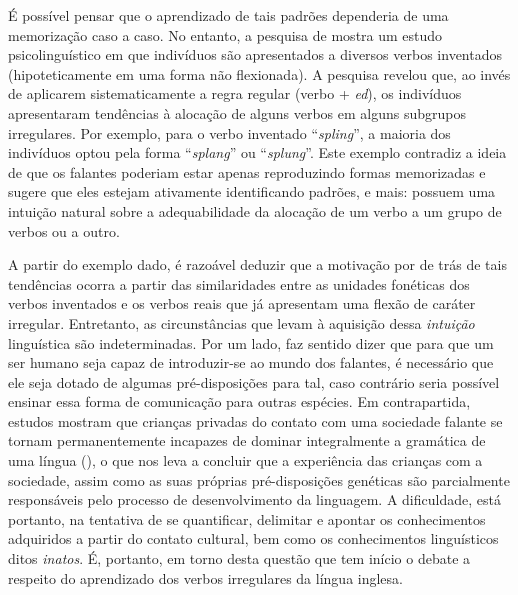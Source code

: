 É possível pensar que o aprendizado de tais padrões dependeria de uma memorização caso a caso. No entanto, a pesquisa de \cite{Bybee:1983} mostra um estudo psicolinguístico em que indivíduos são apresentados a diversos verbos inventados (hipoteticamente em uma forma não flexionada). A pesquisa revelou que, ao invés de aplicarem sistematicamente a regra regular (verbo + \textit{ed}), os indivíduos apresentaram tendências à alocação de alguns verbos em alguns subgrupos irregulares. %
Por exemplo, para o verbo inventado “\textit{spling}”, a maioria dos indivíduos optou pela forma “\textit{splang}”  ou “\textit{splung}”. Este exemplo contradiz a ideia de que os falantes poderiam estar apenas reproduzindo formas memorizadas e sugere que eles estejam ativamente identificando padrões, e mais: possuem uma intuição natural sobre a adequabilidade da alocação de um verbo a um grupo de verbos ou a outro. 

A partir do exemplo dado, é razoável deduzir que a motivação por de trás de tais tendências ocorra a partir das similaridades entre as unidades fonéticas dos verbos inventados e os verbos reais que já apresentam uma flexão de caráter irregular. Entretanto, as circunstâncias que levam à aquisição dessa \textit{intuição} linguística são indeterminadas. Por um lado, faz sentido dizer que para que um ser humano seja capaz de introduzir-se ao mundo dos falantes, é necessário que ele seja dotado de algumas pré-disposições para tal, caso contrário seria possível ensinar essa forma de comunicação para outras espécies. Em contrapartida, estudos mostram que crianças privadas do contato com uma sociedade falante se tornam permanentemente incapazes de dominar integralmente a gramática de uma língua (\cite{Pinker:languageinstinct}), o que nos leva a concluir que a experiência das crianças com a sociedade, assim como as suas próprias pré-disposições genéticas são parcialmente responsáveis pelo processo de desenvolvimento da linguagem. A dificuldade, está portanto, na tentativa de se quantificar, delimitar e apontar os conhecimentos adquiridos a partir do contato cultural, bem como os conhecimentos linguísticos ditos \textit{inatos}. É, portanto, em torno desta questão que tem início o debate a respeito do aprendizado dos verbos irregulares da língua inglesa.

